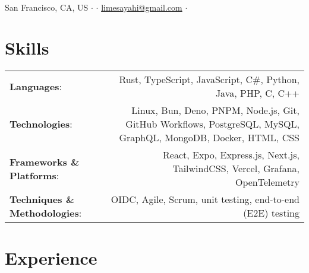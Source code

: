 \documentclass[letterpaper,10pt]{article} %
\begin{document}
\pagestyle{empty}
\par
{\\
\footnotesize{
San Francisco, CA, US
$\cdot$
\href{tel:+1-513-484-0972}{\color{black}{(513) 484-0972}}
$\cdot$
\href{mailto:limesayahi@gmail.com}{\color{black}limesayahi@gmail.com}
$\cdot$
\href{https://github.com/emmyoh}{\color{black}\faGithub}
\href{https://www.linkedin.com/in/emil-sayahi}{\color{black}\faLinkedin}\\
}}

\footnotesize{\textbf{\color{summarycolour}{Systems programmer \& web developer with experience contributing to startups \& commercial open-source software. Knowledgable in low-level programming, interested in building reliable, fast, memory-safe software that scales.}}}

\section{Skills}
\scriptsize{
\begin{tabular*}{\linewidth}{@{\extracolsep{\fill}} lr }
\textbf{Languages}: & Rust, TypeScript, JavaScript, C\#, Python, Java, PHP, C, C++\\
\textbf{Technologies}: & Linux, Bun, Deno, PNPM, Node.js, Git, GitHub Workflows, PostgreSQL, MySQL, GraphQL, MongoDB, Docker, HTML, CSS\\
\textbf{Frameworks \& Platforms}: & React, Expo, Express.js, Next.js, TailwindCSS, Vercel, Grafana, OpenTelemetry\\
\textbf{Techniques \& Methodologies}: & OIDC, Agile, Scrum, unit testing, end-to-end (E2E) testing
\end{tabular*}}

\section{Experience}
\end{document}
